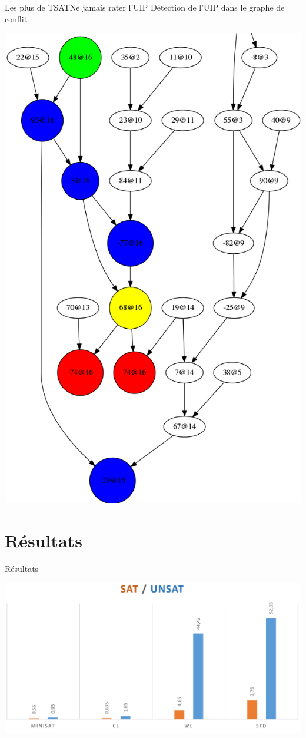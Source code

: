 \documentclass{beamer}
\begin{document}
        \begin{frame}{Les plus de TSAT}{Ne jamais rater l'UIP}
            Détection de l'UIP dans le graphe de conflit 
            \begin{center}
                \includegraphics[scale=0.15]{graphe.png}
            \end{center}
        \end{frame}

    \section{Résultats}
        \begin{frame}{Résultats}{}
            \begin{center}
                \includegraphics[scale=0.25]{time.png}
            \end{center}
        \end{frame}       
\end{document}
